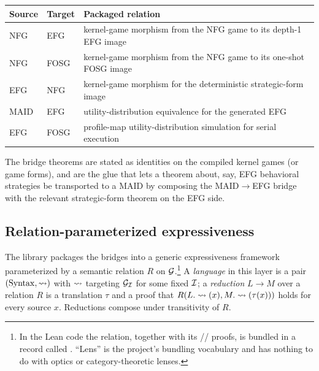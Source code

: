 \begin{center}\small
\begin{tabular}{@{}llp{}@{}}
\toprule
Source & Target & Packaged relation \\
\midrule
NFG  & EFG  & kernel-game morphism from the NFG game to its depth-1 EFG image \\
NFG  & FOSG & kernel-game morphism from the NFG game to its one-shot FOSG image \\
EFG  & NFG  & kernel-game morphism for the deterministic strategic-form image \\
MAID & EFG  & utility-distribution equivalence for the generated EFG \\
EFG  & FOSG & profile-map utility-distribution simulation for serial execution \\
\bottomrule
\end{tabular}
\end{center}

The bridge theorems are stated as identities on the compiled
kernel games (or game forms), and are the glue that lets a
theorem about, say, EFG behavioral strategies be transported to a
MAID by composing the MAID$\to$EFG bridge with the relevant
strategic-form theorem on the EFG side.


\subsection{Relation-parameterized expressiveness}
\label{sec:languages:expressiveness}

The library packages the bridges into a generic expressiveness
framework parameterized by a semantic relation $R$ on
$\mathcal{G}$.\footnote{In the Lean code the relation, together with its
// proofs, is bundled in a record called
.  ``Lens'' is the project's bundling vocabulary
and has nothing to do with optics or category-theoretic lenses.}
A \emph{language} in this layer is a pair $(\mathrm{Syntax},
\rightsquigarrow)$ with $\rightsquigarrow$ targeting $\mathcal{G}_{\mathcal{I}}$ for some
fixed $\mathcal{I}$; a \emph{reduction} $L \to M$ over a relation $R$
is a translation $\tau$ and a proof that
$R(L.\rightsquigarrow(x), M.\rightsquigarrow(\tau(x)))$ holds for every source
$x$.  Reductions compose under transitivity of $R$.

